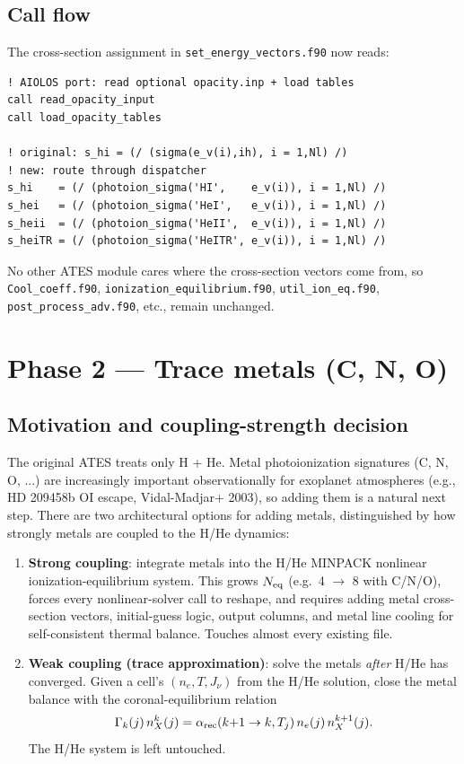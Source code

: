 \documentclass[english,a4paper]{kiseon_memo}
\begin{document}
\subsection{Call flow}

The cross-section assignment in \texttt{set\_energy\_vectors.f90} now reads:

\begin{verbatim}
! AIOLOS port: read optional opacity.inp + load tables
call read_opacity_input
call load_opacity_tables

! original: s_hi = (/ (sigma(e_v(i),ih), i = 1,Nl) /)
! new: route through dispatcher
s_hi    = (/ (photoion_sigma('HI',    e_v(i)), i = 1,Nl) /)
s_hei   = (/ (photoion_sigma('HeI',   e_v(i)), i = 1,Nl) /)
s_heii  = (/ (photoion_sigma('HeII',  e_v(i)), i = 1,Nl) /)
s_heiTR = (/ (photoion_sigma('HeITR', e_v(i)), i = 1,Nl) /)
\end{verbatim}

No other ATES module cares where the cross-section vectors come from, so
\texttt{Cool\_coeff.f90}, \texttt{ionization\_equilibrium.f90},
\texttt{util\_ion\_eq.f90}, \texttt{post\_process\_adv.f90}, etc., remain
unchanged.

\section{Phase 2 --- Trace metals (C, N, O)}

\subsection{Motivation and coupling-strength decision}

The original ATES treats only H + He. Metal photoionization signatures
(C, N, O, ...) are increasingly important observationally for exoplanet
atmospheres (e.g., HD 209458b OI escape, Vidal-Madjar+ 2003), so adding them
is a natural next step. There are two architectural options for adding
metals, distinguished by how strongly metals are coupled to the H/He
dynamics:

\begin{enumerate}
\item \textbf{Strong coupling}: integrate metals into the H/He MINPACK
nonlinear ionization-equilibrium system. This grows $N_{\rm eq}$ (e.g.\
4 $\to$ 8 with C/N/O), forces every nonlinear-solver call to reshape, and
requires adding metal cross-section vectors, initial-guess logic, output
columns, and metal line cooling for self-consistent thermal balance.
Touches almost every existing file.

\item \textbf{Weak coupling (trace approximation)}: solve the metals
\emph{after} H/He has converged. Given a cell's $(n_e, T, J_\nu)$ from the
H/He solution, close the metal balance with the coronal-equilibrium
relation
\[
\Gamma_k(j)\,n_X^k(j)
   = \alpha_{\rm rec}(k{+}1 \to k, T_j)\,n_e(j)\,n_X^{k+1}(j).
\]
The H/He system is left untouched.
\end{enumerate}
\end{document}
